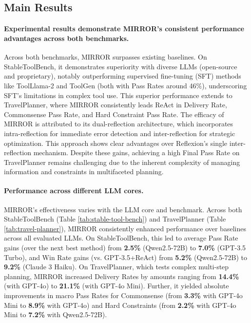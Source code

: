 \documentclass{article}
\begin{document}
\subsection{Main Results}
\paragraph{Experimental results demonstrate MIRROR's consistent performance advantages across both benchmarks.} 
Across both benchmarks, MIRROR surpasses existing baselines. On StableToolBench, it demonstrates superiority with diverse LLMs (open-source and proprietary), notably outperforming supervised fine-tuning (SFT) methods like ToolLlama-2 and ToolGen (both with Pass Rates around 46\%), underscoring SFT's limitations in complex tool use. This superior performance extends to TravelPlanner, where MIRROR consistently leads ReAct in Delivery Rate, Commonsense Pass Rate, and Hard Constraint Pass Rate. The efficacy of MIRROR is attributed to its dual-reflection architecture, which incorporates intra-reflection for immediate error detection and inter-reflection for strategic optimization. This approach shows clear advantages over Reflexion's single inter-reflection mechanism. Despite these gains, achieving a high Final Pass Rate on TravelPlanner remains challenging due to the inherent complexity of managing information and constraints in multifaceted planning.



\paragraph{Performance across different LLM cores.} 
MIRROR's effectiveness varies with the LLM core and benchmark.
Across both StableToolBench (Table \ref{tab:stable-tool-bench}) and TravelPlanner (Table \ref{tab:travel-planner}), MIRROR consistently enhanced performance over baselines across all evaluated LLMs.
On StableToolBench, this led to average Pass Rate gains (over the next best method) from \textbf{2.5\%} (Qwen2.5-72B) to \textbf{7.0\%} (GPT-3.5 Turbo), and Win Rate gains (vs. GPT-3.5+ReAct) from \textbf{5.2\%} (Qwen2.5-72B) to \textbf{9.2\%} (Claude 3 Haiku).
On TravelPlanner, which tests complex multi-step planning, MIRROR increased Delivery Rates by amounts ranging from \textbf{14.4\%} (with GPT-4o) to \textbf{21.1\%} (with GPT-4o Mini). Further, it yielded absolute improvements in macro Pass Rates for Commonsense (from \textbf{3.3\%} with GPT-4o Mini to \textbf{8.9\%} with GPT-4o) and Hard Constraints (from \textbf{2.2\%} with GPT-4o Mini to \textbf{7.2\%} with Qwen2.5-72B).
\end{document}
